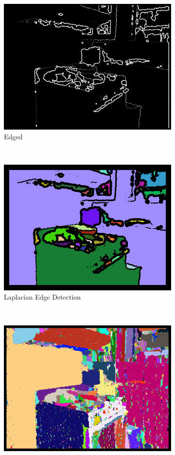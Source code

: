 \begin{figure}
    \centering
    \begin{subfigure}[t]{0.33\textwidth}
        \centering
        \includegraphics[height=.6\textwidth]{figs/Edged321.png}
        \caption{Edged}
        \label{fig:results:edged}
    \end{subfigure}%
    ~ 
    \begin{subfigure}[t]{0.33\textwidth}
        \centering
        \includegraphics[height=.6\textwidth]{figs/Laplacian321.png}
        \caption{Laplacian Edge Detection}
        \label{fig:results:laplacian}
    \end{subfigure}%
    ~ 
    \begin{subfigure}[t]{0.33\textwidth}
        \centering
        \includegraphics[height=.6\textwidth]{figs/Gradient321.png}

\end{subfigure}
\end{figure}
